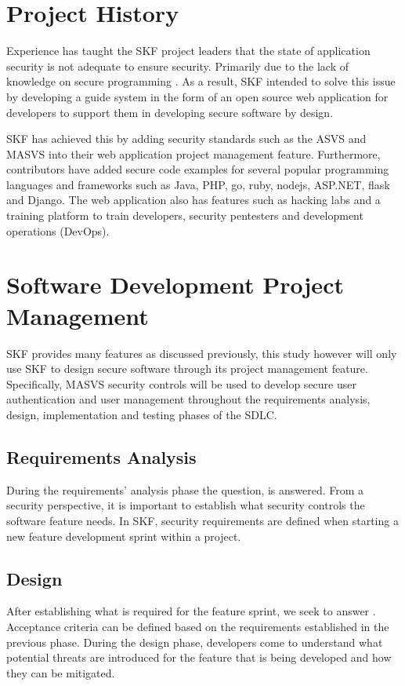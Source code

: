 \section{Project History}
Experience has taught the SKF project leaders that the state of application security is not adequate to ensure security. Primarily due to the lack of knowledge on secure programming \cite{skf_introduction}. As a result, SKF intended to solve this issue by developing a guide system in the form of an open source web application for developers to support them in developing secure software by design.

SKF has achieved this by adding security standards such as the ASVS and MASVS into their web application project management feature. Furthermore, contributors have added secure code examples for several popular programming languages and frameworks such as Java, PHP, go, ruby, nodejs, ASP.NET, flask and Django. The web application also has features such as hacking labs and a training platform to train developers, security pentesters and development operations (DevOps).

\section{Software Development Project Management}
SKF provides many features as discussed previously, this study however will only use SKF to design secure software through its project management feature. Specifically, MASVS security controls will be used to develop secure user authentication and user management throughout the requirements analysis, design, implementation and testing phases of the SDLC. 

\subsection{Requirements Analysis}
During the requirements' analysis phase the question,  is answered. From a security perspective, it is important to establish what security controls the software feature needs. In SKF, security requirements are defined when starting a new feature development sprint within a project.

\subsection{Design}
After establishing what is required for the feature sprint, we seek to answer . Acceptance criteria can be defined based on the requirements established in the previous phase. During the design phase, developers come to understand what potential threats are introduced for the feature that is being developed and how they can be mitigated.

